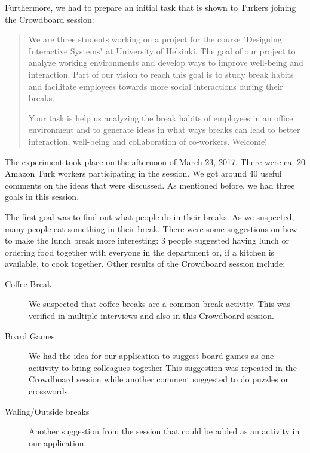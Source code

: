 Furthermore, we had to prepare an initial task that is shown to Turkers joining the Crowdboard session: 

\begin{quote}
We are three students working on a project for the course "Designing Interactive Systems" at University of Helsinki. The goal of our project to analyze working environments and develop ways to improve well-being and interaction. Part of our vision to reach this goal is to study break habits and facilitate employees towards more social interactions during their breaks. 

Your task is help us analyzing the break habits of employees in an office environment and to generate ideas in what ways breaks can lead to better interaction, well-being and collaboration of co-workers. Welcome! 
\end{quote}

The experiment took place on the afternoon of March 23, 2017. There were ca. 20 Amazon Turk workers participating in the session. We got around 40 useful comments on the ideas that were discussed. As mentioned before, we had three goals in this session.

The first goal was to find out what people do in their breaks. As we suspected, many people eat something in their break. There were some suggestions on how to make the lunch break more interesting: 3 people suggested having lunch or ordering food together with everyone in the department or, if a kitchen is available, to cook together. Other results of the Crowdboard session include: 
\begin{description}
  \item[Coffee Break] We suspected that coffee breaks are a common break activity. This was verified in multiple interviews and also in this Crowdboard session.
  \item[Board Games] We had the idea for our application to suggest board games as one acitivity to bring colleagues together This suggestion was repeated in the Crowdboard session while another comment suggested to do puzzles or crosswords.
  \item[Waling/Outside breaks] Another suggestion from the session that could be added as an activity in our application.
\end{description}


